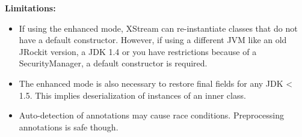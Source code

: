 \textbf{Limitations:}
\begin{itemize}
\item{}If using the enhanced mode, XStream can re-instantiate classes that do not have a default constructor. However, if using a different JVM like an old JRockit version, a JDK 1.4 or you have restrictions because of a SecurityManager, a default constructor is required.
\item{}The enhanced mode is also necessary to restore final fields for any JDK < 1.5. This implies deserialization of instances of an inner class.
\item{}Auto-detection of annotations may cause race conditions. Preprocessing annotations is safe though.
\end{itemize}
